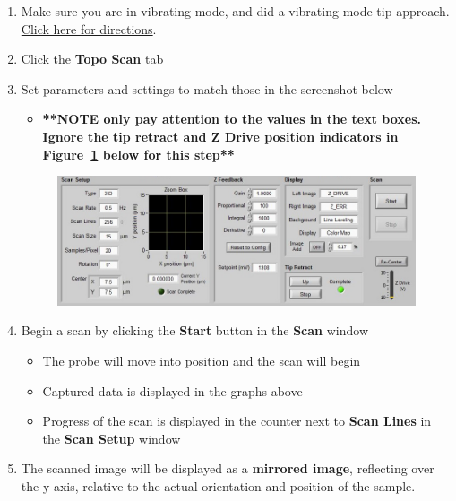 \documentclass{../lab}
\begin{document}
\begin{enumerate}
    \item Make sure you are in vibrating mode, and did a vibrating mode tip approach. \hyperref[subsec:SettingUpPreScanParametersForVibratingScan]{Click here for directions}.
    
    \item Click the \textbf{Topo Scan} tab
    
    \item Set parameters and settings to match those in the screenshot below
    \begin{itemize}
        \item \textbf{**NOTE only pay attention to the values in the text boxes. Ignore the tip retract and Z Drive position indicators in Figure~\ref{fig:TopoScan} below for this step**}
    \end{itemize}
    
    \begin{figure}[H]
        \centering
        \href{http://experimentationlab.berkeley.edu/sites/default/files/AFMImages/toposcansetup.jpg}{\includegraphics[width=0.7\linewidth]{images/toposcansetup.jpg}}
        \caption{}
        \label{fig:TopoScan}
    \end{figure}
    
    \item Begin a scan by clicking the \textbf{Start} button in the \textbf{Scan} window
    \begin{itemize}
        \item The probe will move into position and the scan will begin
        
        \item Captured data is displayed in the graphs above
        
        \item Progress of the scan is displayed in the counter next to \textbf{Scan Lines} in the \textbf{Scan Setup} window
    \end{itemize}
    
    \item The scanned image will be displayed as a \textbf{mirrored image}, reflecting over the y-axis, relative to the actual orientation and position of the sample.
    

\end{enumerate}
\end{document}
